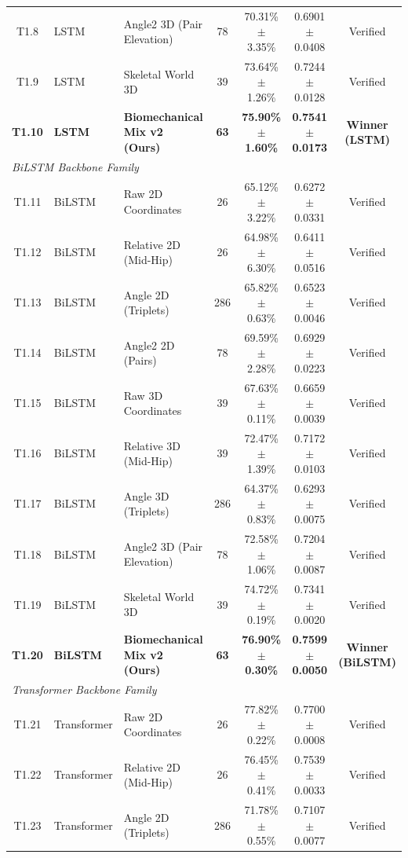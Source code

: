 \documentclass[preprint,12pt]{elsarticle}
\begin{document}
\begin{table}[!t]
{\begin{tabular}{c l l c c c c}
T1.8  & LSTM & Angle2 3D (Pair Elevation) & 78 & 70.31\% $\pm$ 3.35\% & 0.6901 $\pm$ 0.0408 & Verified \\
T1.9  & LSTM & Skeletal World 3D & 39 & 73.64\% $\pm$ 1.26\% & 0.7244 $\pm$ 0.0128 & Verified \\
\textbf{T1.10} & \textbf{LSTM} & \textbf{Biomechanical Mix v2 (Ours)} & \textbf{63} & \textbf{75.90\% $\pm$ 1.60\%} & \textbf{0.7541 $\pm$ 0.0173} & \textbf{Winner (LSTM)} \\
\midrule
\multicolumn{7}{l}{\textit{BiLSTM Backbone Family}} \\
T1.11 & BiLSTM & Raw 2D Coordinates & 26 & 65.12\% $\pm$ 3.22\% & 0.6272 $\pm$ 0.0331 & Verified \\
T1.12 & BiLSTM & Relative 2D (Mid-Hip) & 26 & 64.98\% $\pm$ 6.30\% & 0.6411 $\pm$ 0.0516 & Verified \\
T1.13 & BiLSTM & Angle 2D (Triplets) & 286 & 65.82\% $\pm$ 0.63\% & 0.6523 $\pm$ 0.0046 & Verified \\
T1.14 & BiLSTM & Angle2 2D (Pairs) & 78 & 69.59\% $\pm$ 2.28\% & 0.6929 $\pm$ 0.0223 & Verified \\
T1.15 & BiLSTM & Raw 3D Coordinates & 39 & 67.63\% $\pm$ 0.11\% & 0.6659 $\pm$ 0.0039 & Verified \\
T1.16 & BiLSTM & Relative 3D (Mid-Hip) & 39 & 72.47\% $\pm$ 1.39\% & 0.7172 $\pm$ 0.0103 & Verified \\
T1.17 & BiLSTM & Angle 3D (Triplets) & 286 & 64.37\% $\pm$ 0.83\% & 0.6293 $\pm$ 0.0075 & Verified \\
T1.18 & BiLSTM & Angle2 3D (Pair Elevation) & 78 & 72.58\% $\pm$ 1.06\% & 0.7204 $\pm$ 0.0087 & Verified \\
T1.19 & BiLSTM & Skeletal World 3D & 39 & 74.72\% $\pm$ 0.19\% & 0.7341 $\pm$ 0.0020 & Verified \\
\textbf{T1.20} & \textbf{BiLSTM} & \textbf{Biomechanical Mix v2 (Ours)} & \textbf{63} & \textbf{76.90\% $\pm$ 0.30\%} & \textbf{0.7599 $\pm$ 0.0050} & \textbf{Winner (BiLSTM)} \\
\midrule
\multicolumn{7}{l}{\textit{Transformer Backbone Family}} \\
T1.21 & Transformer & Raw 2D Coordinates & 26 & 77.82\% $\pm$ 0.22\% & 0.7700 $\pm$ 0.0008 & Verified \\
T1.22 & Transformer & Relative 2D (Mid-Hip) & 26 & 76.45\% $\pm$ 0.41\% & 0.7539 $\pm$ 0.0033 & Verified \\
T1.23 & Transformer & Angle 2D (Triplets) & 286 & 71.78\% $\pm$ 0.55\% & 0.7107 $\pm$ 0.0077 & Verified \\

\end{tabular}}
\end{table}
\end{document}
